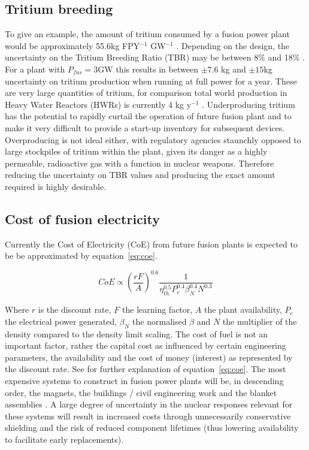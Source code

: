 \subsection{Tritium breeding}
To give an example, the amount of tritium consumed by a fusion power plant would be approximately 55.6kg FPY$^{-1}$ GW$^{-1}$ . Depending on the design, the uncertainty on the Tritium Breeding Ratio (TBR)  may be between 8\% and 18\% \cite{El-Guebaly2009}. For a plant with $P_{fus}=3\mathrm{GW}$  this results in between $\pm7.6$ kg and $\pm15$kg uncertainty on tritium production when running at full power for a year. These are very large quantities of tritium, for comparison total world production in Heavy Water Reactors (HWRs)  is currently 4 kg y$^{-1}$ \cite{Kovari2018}. Underproducing tritium has the potential to rapidly curtail the operation of future fusion plant and to make it very difficult to provide a start-up inventory for subsequent devices. Overproducing is not ideal either, with regulatory agencies staunchly opposed to large stockpiles of tritium within the plant, given its danger as a highly permeable, radioactive gas with a function in nuclear weapons. Therefore reducing the uncertainty on TBR values and producing the exact amount required is highly desirable.

\subsection{Cost of fusion electricity}
Currently the Cost of Electricity (CoE)  from future fusion plants is expected to be be approximated by equation~\ref{eq:coe}. 

\begin{equation}
  \label{eq:coe}
  CoE \propto \left(\frac{rF}{A}\right)^{0.6} \frac{1}{\eta^{0.5}_{th} P^{0.4}_{e} \beta^{0.4}_{N} N^{0.3}}
\end{equation}

Where $r$ is the discount rate, $F$ the learning factor, $A$ the plant availability, $P_{e}$ the electrical power generated, $\beta_{N}$ the normalised $\beta$ and $N$ the multiplier of the density compared to the density limit scaling. The cost of fuel is not an important factor, rather the capital cost as influenced by certain engineering parameters, the availability and the cost of money (interest) as represented by the discount rate. See \cite{Ward2005} for further explanation of equation~\ref{eq:coe}. The most expensive systems to construct in fusion power plants will be, in descending order, the magnets, the buildings / civil engineering work and the blanket assemblies \cite{Entler2018}. A large degree of uncertainty in the nuclear responses relevant for these systems will result in increased costs through unnecessarily conservative shielding and the risk of reduced component lifetimes (thus lowering availability to facilitate early replacements). 

